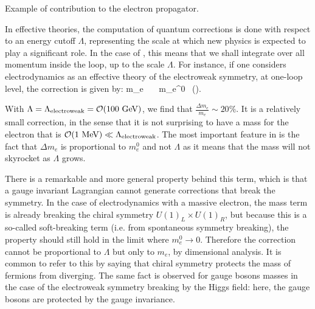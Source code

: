                  {Example of contribution to the electron propagator.}

    In effective theories, the computation of quantum corrections is done with respect to
    an energy cutoff $\Lambda$, representing the scale at which new physics is expected
    to play a significant role. In the case of ,
    this means that we shall integrate over all momentum inside the loop, up to the scale $\Lambda$.
    For instance, if one considers electrodynamics as an effective theory of the electroweak
    symmetry, at one-loop level, the correction is given by:
    {
        \Delta m_e \, \simeq \, \frac{\alpha}{4\pi} \, m_e^0 \, \left(\right).
    }

    With $\Lambda = \Lambda_{\text{electroweak}} = \mathcal{O}(100~\text{GeV})$, we find that
    $\frac{\Delta m_e}{m_e} \sim 20\%$. It is a relatively small correction, in the sense
    that it is not surprising to have a mass for the electron that is $\mathcal{O}(1~\text{MeV}) \ll \Lambda_{\text{electroweak}}$.
    The most important feature in  is the fact that $\Delta m_e$
    is proportional to $m_e^0$ and not $\Lambda$ as it means that the mass will not skyrocket
    as $\Lambda$ grows.

    There is a remarkable and more general property behind this term, which is that a
    gauge invariant Lagrangian cannot generate corrections that break the symmetry. In
    the case of electrodynamics with a massive electron, the mass term is already breaking
    the chiral symmetry $U(1)_L \times U(1)_R$, but because this is a so-called soft-breaking
    term (i.e. from spontaneous symmetry breaking), the property should still hold in
    the limit where $m_e^0 \rightarrow 0$. Therefore the correction cannot be proportional to
    $\Lambda$ but only to $m_e$, by dimensional analysis. It is common to refer to this by
    saying that chiral symmetry protects the mass of fermions from diverging. The same fact
    is observed for gauge bosons masses in the case of the electroweak symmetry breaking by
    the Higgs field: here, the gauge bosons are protected by the gauge invariance.

